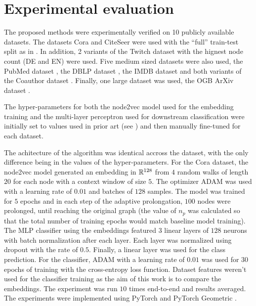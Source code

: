 \section{Experimental evaluation}\label{sec:experimental-evaluation}

The proposed methods were experimentally verified on 10 publicly available datasets. The datasets Cora and CiteSeer \cite{yang_revisiting_2016} were used with the \enquote{full} train-test split as in \cite{chen_fastgcn_2018}. In addition, 2 variants of the Twitch dataset \cite{rozemberczki_multi-scale_2021} with the hignest node count (DE and EN) were used. Five medium sized datasets were also used, the PubMed dataset \cite{yang_revisiting_2016}, the DBLP dataset \cite{bojchevski_deep_2018}, the IMDB dataset \cite{fu_magnn_2020} and both variants of the Coauthor dataset \cite{shchur_pitfalls_2019}. Finally, one large dataset was used, the OGB ArXiv dataset \cite{hu_open_2021}.

The hyper-parameters for both the node2vec model used for the embedding training and the multi-layer perceptron used for downstream classification were initially set to values used in prior art (see \cite{hu_open_2021,fey_fast_2019}) and then manually fine-tuned for each dataset.

The achitecture of the algorithm was identical accross the dataset, with the only difference being in the values of the hyper-parameters. For the Cora dataset, the node2vec model generated an embedding in \( \mathbb{R}^{128} \) from \( 4 \) random walks of length \( 20 \) for each node with a context window of size \( 5 \). The optimizer ADAM \cite{kingma_adam:_2017} was used with a learning rate of \( 0.01 \) and batches of \( 128 \) samples. The model was trained for \( 5 \) epochs and in each step of the adaptive prolongation, \( 100 \) nodes were prolonged, until reaching the original graph (the value of \( n_p \) was calculated so that the total number of training epochs would match baseline model training). The MLP classifier using the embeddings featured \( 3 \) linear layers of \( 128 \) neurons with batch normalization after each layer. Each layer was normalized using dropout \cite{srivastava_dropout_2014} with the rate of \( 0.5 \). Finally, a linear layer was used for the class prediction. For the classifier, ADAM with a learning rate of \( 0.01 \) was used for \( 30 \) epochs of training with the cross-entropy loss function. Dataset features weren't used for the classifier training as the aim of this work is to compare the embeddings. The experiment was run \( 10 \) times end-to-end and results averaged. The experiments were implemented using PyTorch \cite{paszke_pytorch_2019} and PyTorch Geometric \cite{fey_fast_2019}.

